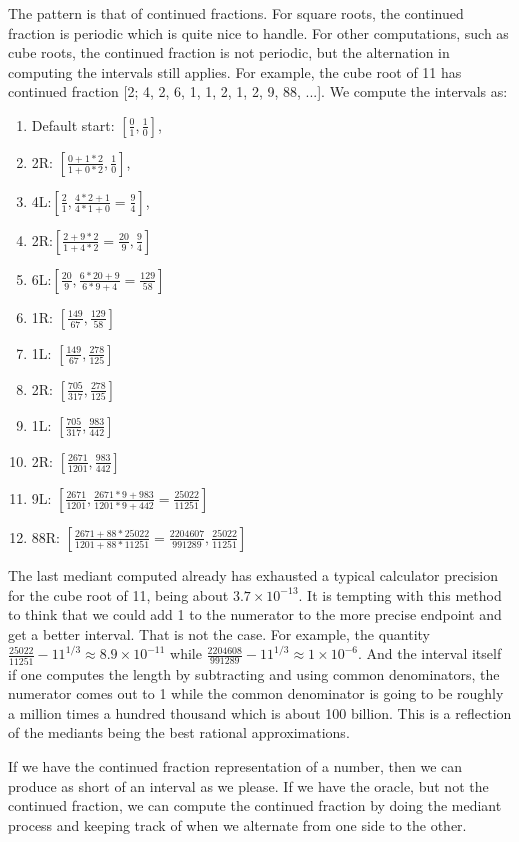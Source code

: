 \documentclass[12pt]{article}
\theoremstyle{remark}
\begin{document}
The pattern is that of continued fractions. For square roots, the continued fraction is periodic which is quite nice to handle. For other computations, such as cube roots, the continued fraction is not periodic, but the alternation in computing the intervals still applies. For example, the cube root of 11 has continued fraction [2; 4, 2, 6, 1, 1, 2, 1, 2, 9, 88, ...]. We compute the intervals as:  
\begin{enumerate}
\item Default start: $[\frac{0}{1}, \frac{1}{0}]$, 
\item 2R: $[\frac{0+1*2}{1+0*2}, \frac{1}{0}]$, 
\item 4L:$[\frac{2}{1}, \frac{4*2+1}{4*1+0} =\frac{9}{4}]$, 
\item 2R:$[\frac{2+9*2}{1+4*2} = \frac{20}{9}, \frac{9}{4}]$
\item 6L:$[\frac{20}{9}, \frac{6*20+9}{6*9 + 4} = \frac{129}{58}]$
\item 1R: $[\frac{149}{67}, \frac{129}{58}]$
\item 1L: $[\frac{149}{67}, \frac{278}{125}]$
\item 2R: $[\frac{705}{317}, \frac{278}{125}]$
\item 1L: $[\frac{705}{317}, \frac{983}{442}]$
\item 2R: $[\frac{2671}{1201}, \frac{983}{442}]$
\item 9L: $[\frac{2671}{1201}, \frac{2671*9+983}{1201*9+442} = \frac{25022}{11251}]$
\item 88R: $[\frac{2671+88*25022}{1201+88*11251} = \frac{2204607}{991289}, \frac{25022}{11251}]$
\end{enumerate}

The last mediant computed already has exhausted a typical calculator precision for the cube root of 11, being about $3.7\times 10^{-13}$. It is tempting with this method to think that we could add 1 to the numerator to the more precise endpoint and get a better interval. That is not the case. For example, the quantity $\frac{25022}{11251} - 11^{1/3} \approx 8.9\times 10^{-11}$ while $\frac{2204608}{991289} - 11^{1/3} \approx 1\times10^{-6}$. And the interval itself if one computes the length by subtracting and using common denominators, the numerator comes out to 1 while the common denominator is going to be roughly a million times a hundred thousand which is about 100 billion. This is a reflection of the mediants being the best rational approximations.  

If we have the continued fraction representation of a number, then we can produce as short of an interval as we please. If we have the oracle, but not the continued fraction, we can compute the continued fraction by doing the mediant process and keeping track of when we alternate from one side to the other. 
\end{document}
